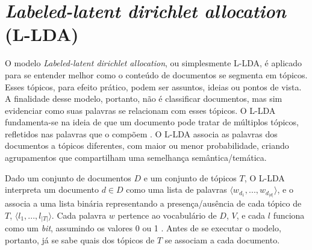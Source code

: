 

\section{\emph{Labeled-latent dirichlet allocation} (L-LDA)}
\label{subsection:LDA}


O modelo \emph{Labeled-latent dirichlet allocation}, ou simplesmente L-LDA, é aplicado para se entender melhor como o conteúdo de documentos se segmenta em tópicos. Esses tópicos, para efeito prático, podem ser assuntos, ideias ou pontos de vista. A finalidade desse modelo, portanto, não é classificar documentos, mas sim evidenciar como suas palavras se relacionam com esses tópicos. O L-LDA fundamenta-se na ideia de que um documento pode tratar de múltiplos tópicos, refletidos nas palavras que o compõem \cite{pnas}.  O L-LDA associa as palavras dos documentos a tópicos diferentes, com maior ou menor probabilidade, criando agrupamentos que compartilham uma semelhança semântica/temática. 

Dado um conjunto de documentos \ensuremath{D} e um conjunto de tópicos \ensuremath{T}, O L-LDA interpreta um documento \ensuremath{d \in D} como uma lista de palavras \ensuremath{\langle w_{d_1}, ..., w_{d_{|d|}} \rangle}, e o associa a uma lista binária representando a presença/ausência de cada tópico de \ensuremath{T}, \ensuremath{\langle l_1, ..., l_{|T|} \rangle}. Cada palavra \ensuremath{w} pertence ao vocabulário de \ensuremath{D}, \ensuremath{V}, e cada \ensuremath{l} funciona como um \emph{bit}, assumindo os valores 0 ou 1 \cite{llda}. Antes de se executar o modelo, portanto, já se sabe quais dos tópicos de \ensuremath{T} se associam a cada documento. 

